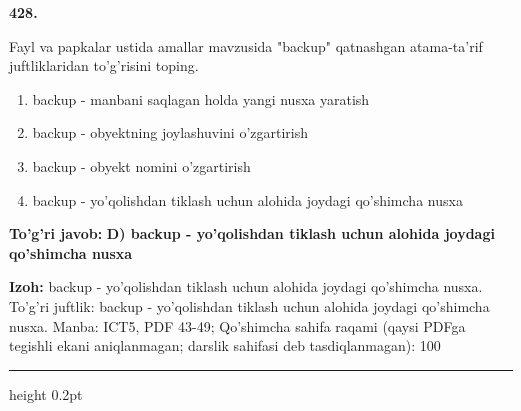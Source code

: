 \documentclass[10pt,a4paper]{article}
\begin{document}
{\bfseries\sffamily\color{ink} 428.}
\par
Fayl va papkalar ustida amallar mavzusida "backup" qatnashgan atama-ta'rif juftliklaridan to'g'risini toping.
\begin{enumerate}[label=\Alph*),leftmargin=9mm]
\item backup - manbani saqlagan holda yangi nusxa yaratish
\item backup - obyektning joylashuvini o'zgartirish
\item backup - obyekt nomini o'zgartirish
\item backup - yo'qolishdan tiklash uchun alohida joydagi qo'shimcha nusxa
\end{enumerate}
\begin{tcolorbox}[enhanced,breakable,colback=teal!4,colframe=teal!60!black,boxrule=0.45pt,arc=1.2mm,left=2.7mm,right=2.7mm,top=1.8mm,bottom=1.8mm,before skip=2mm,after skip=2mm]
{\bfseries\sffamily\color{teal}To'g'ri javob:} \textbf{D) backup - yo'qolishdan tiklash uchun alohida joydagi qo'shimcha nusxa}
\par\smallskip
{\bfseries Izoh:} backup - yo'qolishdan tiklash uchun alohida joydagi qo'shimcha nusxa. To'g'ri juftlik: backup - yo'qolishdan tiklash uchun alohida joydagi qo'shimcha nusxa. Manba: ICT5, PDF 43-49; Qo'shimcha sahifa raqami (qaysi PDFga tegishli ekani aniqlanmagan; darslik sahifasi deb tasdiqlanmagan): 100
\end{tcolorbox}
\vspace{2mm}\hrule height 0.2pt\vspace{3mm}
\end{document}

